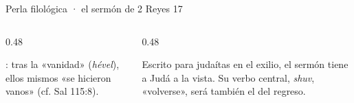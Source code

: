 \begin{frame}{Perla filológica · el sermón de 2 Reyes 17}
\begin{tikzpicture}[node distance=0.24cm]
\end{tikzpicture}
\vspace{4pt}
\begin{columns}[T,onlytextwidth]
\begin{column}{0.48\textwidth}
\begin{notalam}
: tras la «vanidad» (\emph{hével}), ellos mismos «se hicieron vanos» (cf. Sal 115:8).
\end{notalam}
\end{column}
\begin{column}{0.48\textwidth}
\begin{clave}\footnotesize Escrito para judaítas en el exilio, el sermón tiene a Judá a la vista. Su verbo central, \emph{shuv}, «volverse», será también el del regreso.\end{clave}
\end{column}
\end{columns}
\end{frame}

